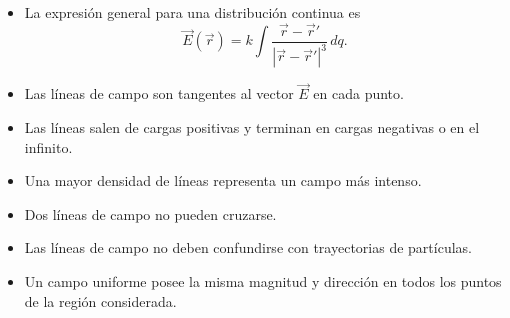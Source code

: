 \begin{resumen}
\begin{itemize}
    \item La expresión general para una distribución continua es
    \[
    \boxed{
    \vec E(\vec r)
    =
    k\int
    \frac{\vec r-\vec r'}
    {|\vec r-\vec r'|^3}\,dq
    }.
    \]

    \item Las líneas de campo son tangentes al vector \(\vec E\) en cada punto.

    \item Las líneas salen de cargas positivas y terminan en cargas negativas o en el
    infinito.

    \item Una mayor densidad de líneas representa un campo más intenso.

    \item Dos líneas de campo no pueden cruzarse.

    \item Las líneas de campo no deben confundirse con trayectorias de partículas.

    \item Un campo uniforme posee la misma magnitud y dirección en todos los puntos
    de la región considerada.
\end{itemize}

\end{resumen}